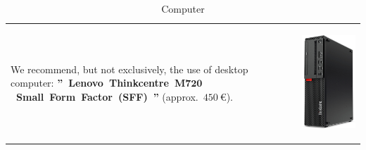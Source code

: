 \documentclass[12pt, a4paper]{article}
\newcommand{\money}[1]{$#1\ \euro{}$\xspace}
\begin{document}
\begin{table}[!htbp]
\begin{tabular}{lr}
\parbox{25em}{
We recommend, but not exclusively, the use
of desktop computer:
\textbf{''~Lenovo~Thinkcentre~M$\mathbf{720}$~Small~Form~Factor~(SFF)~''}
(approx.~\money{450}).
\vspace{-3em}
}

&

\parbox{17em}{
\begin{center}
\includegraphics[scale=0.14]{images/lenovo-thinkcentre-m710sff-hardware.png}
\caption*{Computer}
\end{center}
}
\end{tabular}
\end{table}
	
\end{document}
